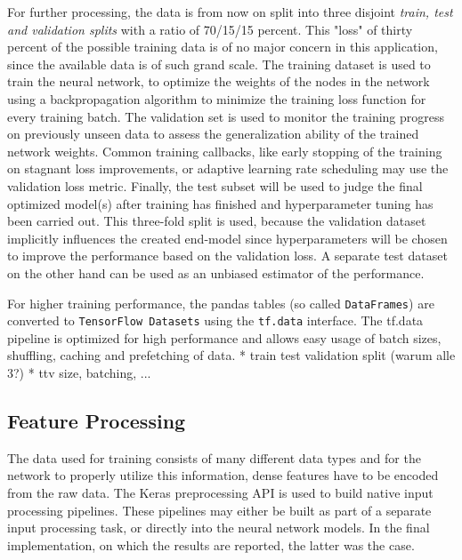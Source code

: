 \documentclass[10pt,final,journal,a4paper,oneside,twocolumn]{IEEEtran}
\begin{document}

For further processing, the data is from now on split into three disjoint \emph{train, test and validation splits} with a ratio of 70/15/15 percent.
This "loss" of thirty percent of the possible training data is of no major concern in this application, since the available data is of such grand scale.
The training dataset is used to train the neural network, to optimize the weights of the nodes in the network using a backpropagation algorithm to minimize the training loss function for every training batch. The validation set is used to monitor the training progress on previously unseen data to assess the generalization ability of the trained network weights. Common training callbacks, like early stopping of the training on stagnant loss improvements, or adaptive learning rate scheduling may use the validation loss metric. Finally, the test subset will be used to judge the final optimized model(s) after training has finished and hyperparameter tuning has been carried out. This three-fold split is used, because the validation dataset implicitly influences the created end-model since hyperparameters will be chosen to improve the performance based on the validation loss. A separate test dataset on the other hand can be used as an unbiased estimator of the performance.

For higher training performance, the pandas tables (so called \texttt{DataFrames}) are converted to \texttt{TensorFlow Datasets} using the \texttt{tf.data} interface. The tf.data pipeline is optimized for high performance and allows easy usage of batch sizes, shuffling, caching and prefetching of data\footnotemark.
* train test validation split (warum alle 3?)
* ttv size, batching, ...

\subsection{Feature Processing}
The data used for training consists of many different data types and for the network to properly utilize this information, dense features have to be encoded from the raw data. The Keras preprocessing API is used to build native input processing pipelines\footnotemark. These pipelines may either be built as part of a separate input processing task, or directly into the neural network models. In the final implementation, on which the results are reported, the latter was the case.
\end{document}
